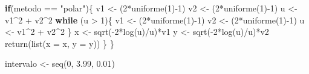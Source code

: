 \documentclass[
]{article}
\newenvironment{Shaded}{\begin{snugshade}}{\end{snugshade}}
\newcommand{\AttributeTok}[1]{\textcolor[rgb]{0.77,0.63,0.00}{#1}}
\newcommand{\ControlFlowTok}[1]{\textcolor[rgb]{0.13,0.29,0.53}{\textbf{#1}}}
\newcommand{\DecValTok}[1]{\textcolor[rgb]{0.00,0.00,0.81}{#1}}
\newcommand{\FloatTok}[1]{\textcolor[rgb]{0.00,0.00,0.81}{#1}}
\newcommand{\FunctionTok}[1]{\textcolor[rgb]{0.00,0.00,0.00}{#1}}
\newcommand{\NormalTok}[1]{#1}
\newcommand{\OtherTok}[1]{\textcolor[rgb]{0.56,0.35,0.01}{#1}}
\newcommand{\SpecialCharTok}[1]{\textcolor[rgb]{0.00,0.00,0.00}{#1}}
\newcommand{\StringTok}[1]{\textcolor[rgb]{0.31,0.60,0.02}{#1}}
\begin{document}
\begin{Shaded}
\begin{Highlighting}[]
  \ControlFlowTok{if}\NormalTok{(metodo }\SpecialCharTok{==} \StringTok{"polar"}\NormalTok{)\{}
\NormalTok{    v1 }\OtherTok{\textless{}{-}}\NormalTok{ (}\DecValTok{2}\SpecialCharTok{*}\FunctionTok{uniforme}\NormalTok{(}\DecValTok{1}\NormalTok{)}\SpecialCharTok{{-}}\DecValTok{1}\NormalTok{)}
\NormalTok{    v2 }\OtherTok{\textless{}{-}}\NormalTok{ (}\DecValTok{2}\SpecialCharTok{*}\FunctionTok{uniforme}\NormalTok{(}\DecValTok{1}\NormalTok{)}\SpecialCharTok{{-}}\DecValTok{1}\NormalTok{)}
\NormalTok{    u }\OtherTok{\textless{}{-}}\NormalTok{ v1}\SpecialCharTok{\^{}}\DecValTok{2} \SpecialCharTok{+}\NormalTok{ v2}\SpecialCharTok{\^{}}\DecValTok{2}
    \ControlFlowTok{while}\NormalTok{ (u }\SpecialCharTok{\textgreater{}} \DecValTok{1}\NormalTok{)\{}
\NormalTok{      v1 }\OtherTok{\textless{}{-}}\NormalTok{ (}\DecValTok{2}\SpecialCharTok{*}\FunctionTok{uniforme}\NormalTok{(}\DecValTok{1}\NormalTok{)}\SpecialCharTok{{-}}\DecValTok{1}\NormalTok{)}
\NormalTok{      v2 }\OtherTok{\textless{}{-}}\NormalTok{ (}\DecValTok{2}\SpecialCharTok{*}\FunctionTok{uniforme}\NormalTok{(}\DecValTok{1}\NormalTok{)}\SpecialCharTok{{-}}\DecValTok{1}\NormalTok{)}
\NormalTok{      u }\OtherTok{\textless{}{-}}\NormalTok{ v1}\SpecialCharTok{\^{}}\DecValTok{2} \SpecialCharTok{+}\NormalTok{ v2}\SpecialCharTok{\^{}}\DecValTok{2}
\NormalTok{    \}}
\NormalTok{    x }\OtherTok{\textless{}{-}} \FunctionTok{sqrt}\NormalTok{(}\SpecialCharTok{{-}}\DecValTok{2}\SpecialCharTok{*}\FunctionTok{log}\NormalTok{(u)}\SpecialCharTok{/}\NormalTok{u)}\SpecialCharTok{*}\NormalTok{v1}
\NormalTok{    y }\OtherTok{\textless{}{-}} \FunctionTok{sqrt}\NormalTok{(}\SpecialCharTok{{-}}\DecValTok{2}\SpecialCharTok{*}\FunctionTok{log}\NormalTok{(u)}\SpecialCharTok{/}\NormalTok{u)}\SpecialCharTok{*}\NormalTok{v2}
    \FunctionTok{return}\NormalTok{(}\FunctionTok{list}\NormalTok{(}\AttributeTok{x =}\NormalTok{ x, }\AttributeTok{y =}\NormalTok{ y))}
\NormalTok{  \}}
\NormalTok{\}}

\NormalTok{intervalo }\OtherTok{\textless{}{-}} \FunctionTok{seq}\NormalTok{(}\DecValTok{0}\NormalTok{, }\FloatTok{3.99}\NormalTok{, }\FloatTok{0.01}\NormalTok{)}


\end{Highlighting}
\end{Shaded}
\end{document}
